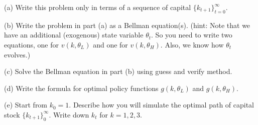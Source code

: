 \documentclass[10pt, a4paper]{article}
\begin{document}
    (a) Write this problem only in terms of a sequence of capital $\{k_{t+1}\}_{t=0}^{\infty}$.

    (b) Write the problem in part (a) as a Bellman equation(s). (hint: Note that we have an additional (exogenous) state variable $\theta_t$. So you need to write two equations, one for $v(k,\theta_L)$ and one for $v(k,\theta_H)$. Also, we know how $\theta_t$ evolves.)

    (c) Solve the Bellman equation in part (b) using guess and verify method.

    (d) Write the formula for optimal policy functions $g(k,\theta_L)$ and $g(k,\theta_H)$.

    (e) Start from $k_0=1$. Describe how you will simulate the optimal path of capital stock $\{k_{t+1}\}_0^{\infty}$. Write down $k_t$ for $k=1,2,3$. 
\end{document}
